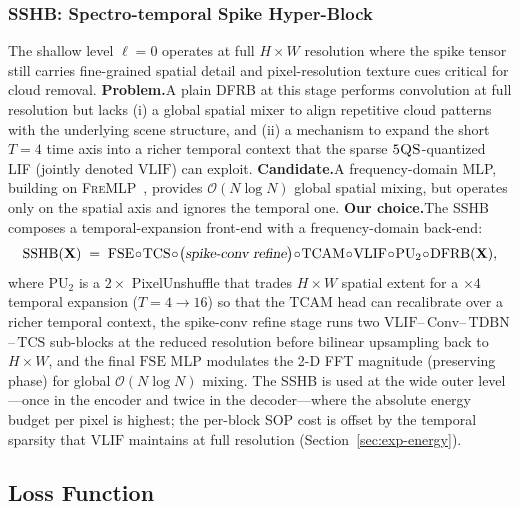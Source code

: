 \documentclass[conference]{IEEEtran}
\newcommand{\DFRB}{\textsc{DFRB}}
\newcommand{\SSHB}{\textsc{SSHB}}
\newcommand{\FQS}{\textsc{5QS}}
\begin{document}
\subsubsection{\SSHB{}: Spectro-temporal Spike Hyper-Block}\label{sec:framework-sshb}

The shallow level $\ell\!=\!0$ operates at full $H\!\times\!W$
resolution where the spike tensor still carries fine-grained spatial
detail and pixel-resolution texture cues critical for cloud
removal. \textbf{Problem.}\;\;A plain \DFRB{} at this stage
performs convolution at full resolution but lacks (i) a global
spatial mixer to align repetitive cloud patterns with the
underlying scene structure, and (ii) a mechanism to expand the
short $T\!=\!4$ time axis into a richer temporal context that the
sparse $\FQS$-quantized LIF (jointly denoted $\mathrm{VLIF}$) can
exploit. \textbf{Candidate.}\;\;A frequency-domain MLP, building on
\textsc{FreMLP}~\cite{ref:darkir}, provides $\mathcal{O}(N\log N)$
global spatial mixing, but operates only on the spatial axis and
ignores the temporal one.
\textbf{Our choice.}\;\;The \SSHB{} composes a temporal-expansion
front-end with a frequency-domain back-end:
\begin{equation}
\mathrm{SSHB}(\mathbf{X}) \;=\;
\mathrm{FSE}\!\circ\!\mathrm{TCS}\!\circ\!
\big(\textsl{spike-conv refine}\big)\!\circ\!
\mathrm{TCAM}\!\circ\!\mathrm{VLIF}\!\circ\!
\mathrm{PU}_{2}\!\circ\!\mathrm{DFRB}(\mathbf{X}),
\label{eq:sshb}
\end{equation}
where $\mathrm{PU}_{2}$ is a $2\!\times\!$ PixelUnshuffle that
trades $H\!\times\!W$ spatial extent for a $\times 4$ temporal
expansion ($T\!=\!4\!\to\!16$) so that the $\mathrm{TCAM}$ head can
recalibrate over a richer temporal context, the spike-conv refine
stage runs two $\mathrm{VLIF}$\!--\,$\mathrm{Conv}$\!--\,$\mathrm{TDBN}$\!--\,$\mathrm{TCS}$
sub-blocks at the reduced resolution before bilinear upsampling
back to $H\!\times\!W$, and the final $\mathrm{FSE}$ MLP modulates
the 2-D FFT magnitude (preserving phase) for global
$\mathcal{O}(N\log N)$ mixing. The \SSHB{} is used at the wide
outer level---once in the encoder and twice in the
decoder---where the absolute energy budget per pixel is highest;
the per-block SOP cost is offset by the temporal sparsity that
$\mathrm{VLIF}$ maintains at full resolution
(Section~\ref{sec:exp-energy}).

\subsection{Loss Function}\label{sec:framework-loss}
\end{document}
